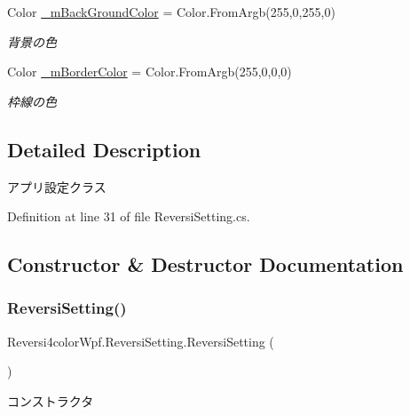 \begin{DoxyCompactItemize}
Color \hyperlink{class_reversi4color_wpf_1_1_reversi_setting_a98f04cb8228e776c7fb1dc12b1c504e0}{\+\_\+m\+Back\+Ground\+Color} = Color.\+From\+Argb(255,0,255,0)
\begin{DoxyCompactList}\small\item\em 背景の色 \end{DoxyCompactList}\item 
\mbox{\label{class_reversi4color_wpf_1_1_reversi_setting_af3cec7c0c84df9e9bd138e02a4be3c88}} 
Color \hyperlink{class_reversi4color_wpf_1_1_reversi_setting_af3cec7c0c84df9e9bd138e02a4be3c88}{\+\_\+m\+Border\+Color} = Color.\+From\+Argb(255,0,0,0)
\begin{DoxyCompactList}\small\item\em 枠線の色 \end{DoxyCompactList}\end{DoxyCompactItemize}


\subsection{Detailed Description}
アプリ設定クラス 

Definition at line 31 of file Reversi\+Setting.\+cs.



\subsection{Constructor \& Destructor Documentation}
\mbox{\label{class_reversi4color_wpf_1_1_reversi_setting_a630bca61bfcbb2e5683ca09393db79a8}} 
\subsubsection{\texorpdfstring{Reversi\+Setting()}{ReversiSetting()}}
{\footnotesize\ttfamily Reversi4color\+Wpf.\+Reversi\+Setting.\+Reversi\+Setting (\begin{DoxyParamCaption}{ }\end{DoxyParamCaption})}



コンストラクタ 

